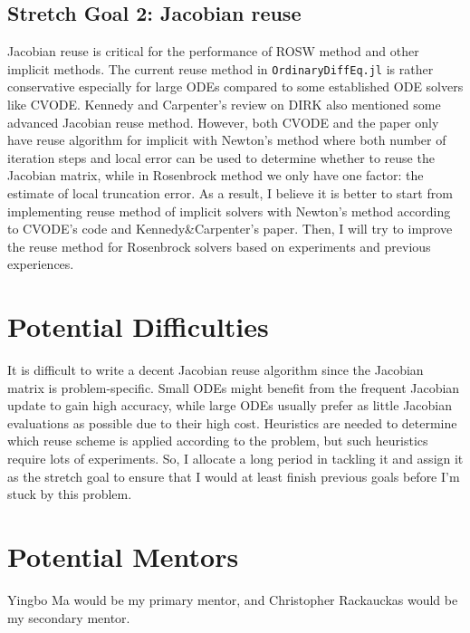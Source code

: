 \documentclass[a4paper]{article}
\begin{document}
\subsection{Stretch Goal 2: Jacobian reuse}
\label{sec:org99f1ddc}
Jacobian reuse is critical for the performance of ROSW method and other implicit
methods. The current reuse method in \texttt{OrdinaryDiffEq.jl} is rather conservative
especially for large ODEs compared to some established ODE solvers like CVODE.
Kennedy and Carpenter's review \cite{six} on DIRK also mentioned some advanced Jacobian
reuse method. However, both CVODE and the paper only have reuse algorithm for
implicit with Newton's method where both number of iteration steps and local
error can be used to determine whether to reuse the Jacobian matrix, while in
Rosenbrock method we only have one factor: the estimate of local truncation
error. As a result, I believe it is better to start from implementing reuse
method of implicit solvers with Newton's method according to CVODE's code and
Kennedy\&Carpenter's paper. Then, I will try to improve the reuse method for
Rosenbrock solvers based on experiments and previous experiences. 

\section{Potential Difficulties}
\label{sec:orgfe0dd28}
It is difficult to write a decent Jacobian reuse algorithm since the Jacobian
matrix is problem-specific. Small ODEs might benefit from the frequent Jacobian
update to gain high accuracy, while large ODEs usually prefer as little Jacobian
evaluations as possible due to their high cost. Heuristics are needed to
determine which reuse scheme is applied according to the problem, but such
heuristics require lots of experiments. So, I allocate a long period in tackling
it and assign it as the stretch goal to ensure that I would at least finish
previous goals before I'm stuck by this problem. 

\section{Potential Mentors}
\label{sec:org96c5f5e}
Yingbo Ma would be my primary mentor, and Christopher Rackauckas would be my
secondary mentor. 
\end{document}
